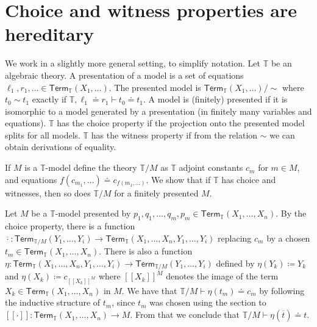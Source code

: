 \documentclass[10pt,a4paper]{article}
\theoremstyle{definition}
\theoremstyle{remark}
\newcommand\Term{\mathsf{Term}}
\newcommand\bbT{\mathbb{T}}
\begin{document}



\appendix

\section{Choice and witness properties are hereditary}

We work in a slightly more general setting, to simplify notation.
Let \(\bbT\) be an algebraic theory.
A presentation of a model is a set of equations \(\ell_1, r_1, \ldots \in \Term_{\bbT}(X_1, \ldots)\).
The presented model is \(\Term_{\bbT}(X_1, \ldots) / \sim\) where \(t_0 \sim t_1\) exactly if \(\bbT, \ell_1 \doteq r_1 \vdash t_0 \doteq t_1\).
A model is (finitely) presented if it is isomorphic to a model generated by a presentation (in finitely many variables and equations).
\(\bbT\) has the choice property if the projection onto the presented model splits for all models.
\(\bbT\) has the witness property if from the relation \(\sim\) we can obtain derivations of equality.

If \(M\) is a \(\bbT\)-model define the theory \(\bbT/M\) as \(\bbT\) adjoint constants \(c_m\) for \(m \in M\), and equations \(f(c_{m_1}, \ldots) \doteq c_{f(m_1, \ldots)}\).
We show that if \(\bbT\) has choice and witnesses, then so does \(\bbT/M\) for a finitely presented \(M\).

Let \(M\) be a \(\bbT\)-model presented by \(p_1, q_1, \ldots, q_m, p_m \in \Term_{\bbT}(X_1, \ldots, X_n)\).
By the choice property, there is a function \(\overline{\cdot} \colon \Term_{\bbT/M}(Y_1, \ldots, Y_i) \to \Term_{\bbT}(X_1, \ldots, X_n, Y_1, \ldots, Y_i)\) replacing \(c_m\) by a chosen \(t_m \in \Term_{\bbT}(X_1, \ldots, X_n)\).
There is also a function \(\eta \colon \Term_{\bbT}(X_1, \ldots, X_n, Y_1, \ldots, Y_i) \to \Term_{\bbT/M}(Y_1, \ldots, Y_i)\) defined by \(\eta(Y_k) \coloneqq Y_k\) and \(\eta(X_k) \coloneqq c_{[\![X_k]\!]^M}\) where \([\![X_k]\!]^M\) denotes the image of the term \(X_k \in \Term_{\bbT}(X_1, \ldots, X_n)\) in \(M\).
We have that \(\bbT/M \vdash \eta(t_m) \doteq c_m\) by following the inductive structure of \(t_m\), since \(t_m\) was chosen using the section to \([\![\cdot]\!] \colon \Term_{\bbT}(X_1, \ldots, X_n) \to M\).
From that we conclude that \(\bbT/M \vdash \eta(\overline{t}) \doteq t\).
\end{document}
